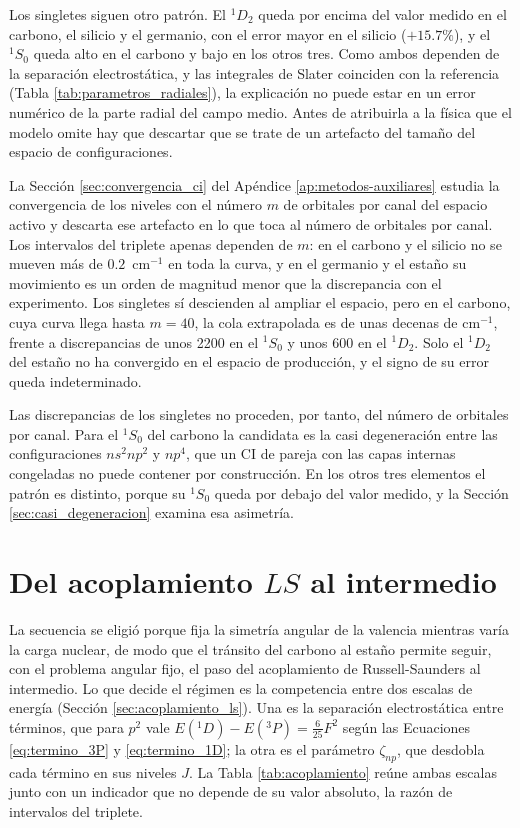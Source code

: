 Los singletes siguen otro patrón. El $^1D_2$ queda por encima del valor medido en el carbono, el silicio y el germanio, con el error mayor en el silicio ($+15.7\%$), y el $^1S_0$ queda alto en el carbono y bajo en los otros tres. Como ambos dependen de la separación electrostática, y las integrales de Slater coinciden con la referencia (Tabla \ref{tab:parametros_radiales}), la explicación no puede estar en un error numérico de la parte radial del campo medio. Antes de atribuirla a la física que el modelo omite hay que descartar que se trate de un artefacto del tamaño del espacio de configuraciones.

La Sección \ref{sec:convergencia_ci} del Apéndice \ref{ap:metodos-auxiliares} estudia la convergencia de los niveles con el número $m$ de orbitales por canal del espacio activo y descarta ese artefacto en lo que toca al número de orbitales por canal. Los intervalos del triplete apenas dependen de $m$: en el carbono y el silicio no se mueven más de $0.2$~cm$^{-1}$ en toda la curva, y en el germanio y el estaño su movimiento es un orden de magnitud menor que la discrepancia con el experimento. Los singletes sí descienden al ampliar el espacio, pero en el carbono, cuya curva llega hasta $m=40$, la cola extrapolada es de unas decenas de cm$^{-1}$, frente a discrepancias de unos 2200 en el $^1S_0$ y unos 600 en el $^1D_2$. Solo el $^1D_2$ del estaño no ha convergido en el espacio de producción, y el signo de su error queda indeterminado.

Las discrepancias de los singletes no proceden, por tanto, del número de orbitales por canal. Para el $^1S_0$ del carbono la candidata es la casi degeneración entre las configuraciones $ns^2np^2$ y $np^4$, que un CI de pareja con las capas internas congeladas no puede contener por construcción. En los otros tres elementos el patrón es distinto, porque su $^1S_0$ queda por debajo del valor medido, y la Sección \ref{sec:casi_degeneracion} examina esa asimetría.

\section{Del acoplamiento \texorpdfstring{$LS$}{LS} al intermedio}
\label{sec:regimen_acoplamiento}

La secuencia se eligió porque fija la simetría angular de la valencia mientras varía la carga nuclear, de modo que el tránsito del carbono al estaño permite seguir, con el problema angular fijo, el paso del acoplamiento de Russell-Saunders al intermedio. Lo que decide el régimen es la competencia entre dos escalas de energía (Sección \ref{sec:acoplamiento_ls}). Una es la separación electrostática entre términos, que para $p^2$ vale $E(^1D) - E(^3P) = \tfrac{6}{25}F^2$ según las Ecuaciones \eqref{eq:termino_3P} y \eqref{eq:termino_1D}; la otra es el parámetro $\zeta_{np}$, que desdobla cada término en sus niveles $J$. La Tabla \ref{tab:acoplamiento} reúne ambas escalas junto con un indicador que no depende de su valor absoluto, la razón de intervalos del triplete.

